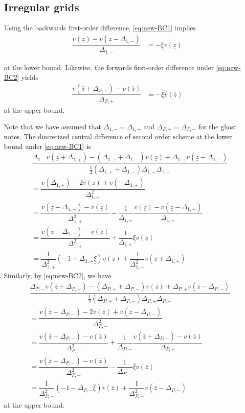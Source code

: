 \documentclass[11pt]{article}
\begin{document}
\subsection{Irregular grids}
Using the backwards first-order difference, \eqref{eq:new-BC1} implies
\begin{align}
\dfrac{v(\underline{z}) - v(\underline{z}-\Delta_{1, -})}{\Delta_{1, -}} &= - \underline{\xi} v(\underline{z})
\end{align}

at the lower bound. Likewise, the forwards first-order difference under \eqref{eq:new-BC2} yields
\begin{align}
\dfrac{v(\overline{z} + \Delta_{P, +}) - v( \overline{z})}{\Delta_{P, +}} &= - \overline{\xi} v(\overline{z})
\end{align}
at the upper bound.

Note that we have assumed that $\Delta_{1,-} = \Delta_{1,+}$ and $\Delta_{P,+} = \Delta_{P,-}$ for the ghost notes. The discretized central difference of second order scheme at the lower bound under \eqref{eq:new-BC1} is 
\begin{align}
&\dfrac{\Delta_{1,-} v( \underline{z} + \Delta_{1,+}) - (\Delta_{1,+} + \Delta_{1,-}) v(\underline{z}) + \Delta_{1,+}  v( \underline{z} - \Delta_{1,-})}{\frac{1}{2}(\Delta_{1,+} + \Delta_{1,-}) \Delta_{1,+} \Delta_{1,-} } \\
&=
\dfrac{v (\Delta_{1, +}) - 2 v(\underline{z}) + v(-\Delta_{1, +})}{\Delta_{1, +}^2} \\ 
&= \dfrac{v(\underline{z} + \Delta_{1, +}) - v(\underline{z})}{\Delta_{1, +}^2} - \dfrac{1}{\Delta_{1, +}}\dfrac{v(\underline{z}) - v(\underline{z}-\Delta_{1, +}) }{\Delta_{1, +}}  \\
&= \dfrac{v(\underline{z} + \Delta_{1, +}) - v(\underline{z})}{\Delta_{1, +}^2} + \dfrac{1}{\Delta_{i,+}} \underline{\xi} v(\underline{z})  \\ 
&= \dfrac{1}{\Delta_{1, +}^2}  (- 1 + \Delta_{1, +} \underline{\xi}) v(\underline{z})  + \dfrac{1}{\Delta_{1, +}^2}  v(\underline{z} + \Delta_{1, +})  
\end{align}
Similarly, by \eqref{eq:new-BC2}, we have
\begin{align}
&\dfrac{\Delta_{P,-} v( \bar{z} + \Delta_{P,+}) - (\Delta_{P,+} + \Delta_{P,-}) v(\bar{z} ) + \Delta_{P,+}  v( \bar{z} - \Delta_{P,-})}{\frac{1}{2}(\Delta_{P,+} + \Delta_{P,-}) \Delta_{P,+} \Delta_{P,-} } \\
&=\dfrac{v (\bar{z} + \Delta_{P,-}) - 2 v(\bar{z} ) + v(\bar{z} -\Delta_{P,-})}{\Delta_{P,-}^2} \\
&=   \dfrac{v(\bar{z} - \Delta_{P,-}) - v(\bar{z})}{\Delta_{P,-}^2} + \dfrac{1}{\Delta_{P,-}}\dfrac{ v(\bar{z}+\Delta_{P,-}) - v (\bar{z}) }{\Delta_{P,-}}  \\
&= \dfrac{v(\bar{z} - \Delta_{P,-}) - v(\bar{z})}{\Delta_{P,-}^2}  - \dfrac{1}{\Delta_{P,-}} \overline{\xi} v(\bar{z})  \\ 
&= \dfrac{1}{\Delta_{P,-}^2}  (- 1 - \Delta_{P,-} \overline{\xi}) v(\bar{z})  + \dfrac{1}{\Delta_{P,-}^2}  v(\bar{z} - \Delta_{P,-})  
\end{align}
at the upper bound.
\end{document}
